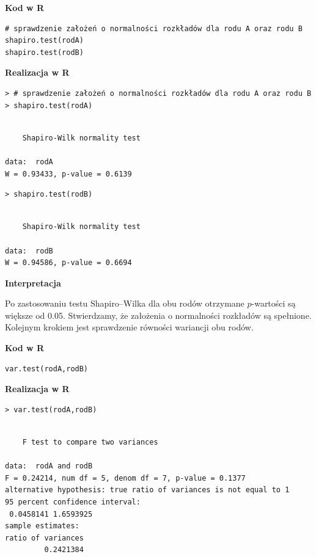 \documentclass[12pt,B5paper,]{book}
\begin{document}
\vspace{0.8cm} \textbf{Kod w R}

\begin{verbatim}
# sprawdzenie założeń o normalności rozkładów dla rodu A oraz rodu B
shapiro.test(rodA)
shapiro.test(rodB)
\end{verbatim}

\vspace{0.8cm} \textbf{Realizacja w R}

\begin{verbatim}
> # sprawdzenie założeń o normalności rozkładów dla rodu A oraz rodu B
> shapiro.test(rodA)
\end{verbatim}

\begin{verbatim}

    Shapiro-Wilk normality test

data:  rodA
W = 0.93433, p-value = 0.6139
\end{verbatim}

\begin{verbatim}
> shapiro.test(rodB)
\end{verbatim}

\begin{verbatim}

    Shapiro-Wilk normality test

data:  rodB
W = 0.94586, p-value = 0.6694
\end{verbatim}

\vspace{0.8cm} \textbf{Interpretacja}

Po zastosowaniu testu Shapiro--Wilka dla obu rodów otrzymane
\(p\)-wartości są większe od 0.05. Stwierdzamy, że założenia o
normalności rozkładów są spełnione. Kolejnym krokiem jest sprawdzenie
równości wariancji obu rodów.

\vspace{0.8cm} \textbf{Kod w R}

\begin{verbatim}
var.test(rodA,rodB)
\end{verbatim}

\vspace{0.8cm} \textbf{Realizacja w R}

\begin{verbatim}
> var.test(rodA,rodB)
\end{verbatim}

\begin{verbatim}

    F test to compare two variances

data:  rodA and rodB
F = 0.24214, num df = 5, denom df = 7, p-value = 0.1377
alternative hypothesis: true ratio of variances is not equal to 1
95 percent confidence interval:
 0.0458141 1.6593925
sample estimates:
ratio of variances 
         0.2421384 
\end{verbatim}
\end{document}
